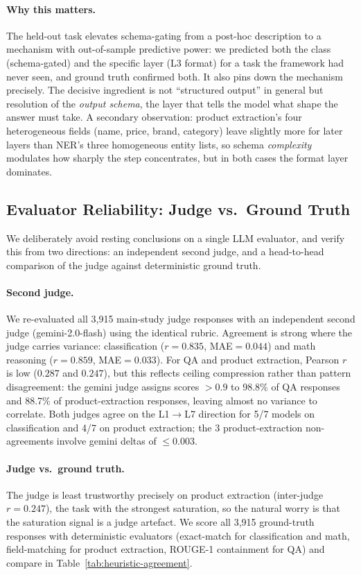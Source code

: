 \paragraph{Why this matters.}
The held-out task elevates schema-gating from a post-hoc description to a
mechanism with out-of-sample predictive power: we predicted both the class
(schema-gated) and the specific layer (L3 format) for a task the framework had
never seen, and ground truth confirmed both. It also pins down the mechanism
precisely. The decisive ingredient is not ``structured output'' in general but
resolution of the \emph{output schema}, the layer that tells the model what
shape the answer must take. A secondary observation: product extraction's four
heterogeneous fields (name, price, brand, category) leave slightly more for
later layers than NER's three homogeneous entity lists, so schema
\emph{complexity} modulates how sharply the step concentrates, but in both cases
the format layer dominates.

\subsection{Evaluator Reliability: Judge vs.\ Ground Truth}
\label{sec:result-judge}

We deliberately avoid resting conclusions on a single LLM evaluator, and verify
this from two directions: an independent second judge, and a head-to-head
comparison of the judge against deterministic ground truth.

\paragraph{Second judge.}
We re-evaluated all 3,915 main-study judge responses with an independent second
judge (gemini-2.0-flash) using the identical rubric. Agreement is strong where
the judge carries variance: classification ($r = 0.835$, MAE$= 0.044$) and math
reasoning ($r = 0.859$, MAE$= 0.033$). For QA and product extraction, Pearson
$r$ is low ($0.287$ and $0.247$), but this reflects ceiling compression rather
than pattern disagreement: the gemini judge assigns scores $> 0.9$ to 98.8\% of
QA responses and 88.7\% of product-extraction responses, leaving almost no
variance to correlate. Both judges agree on the L1$\to$L7 direction for 5/7
models on classification and 4/7 on product extraction; the 3
product-extraction non-agreements involve gemini deltas of $\leq 0.003$.

\paragraph{Judge vs.\ ground truth.}
The judge is least trustworthy precisely on product extraction (inter-judge
$r = 0.247$), the task with the strongest saturation, so the natural worry is
that the saturation signal is a judge artefact. We score all 3,915 ground-truth
responses with deterministic evaluators (exact-match for classification and
math, field-matching for product extraction, ROUGE-1 containment for QA) and
compare in Table~\ref{tab:heuristic-agreement}.

